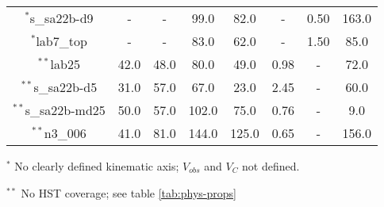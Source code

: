 \documentclass[fleqn,usenatbib]{mn2e}
\begin{document}
\begin{table*}
\begin{threeparttable}
\begin{tabular}{cccccccc}
$^{*}$s\_sa22b-d9   & -                    & -                      & 99.0                  & 82.0                   & -      & 0.50       & 163.0  \\
$^{*}$lab7\_top     & -                    & -                      & 83.0                  & 62.0                   & -      & 1.50       & 85.0  \\
$^{**}$lab25         & 42.0                    & 48.0                     & 80.0                  & 49.0                   & 0.98       & -       & 72.0 \\
$^{**}$s\_sa22b-d5   & 31.0                    & 57.0                     & 67.0                  & 23.0                   & 2.45      & -       & 60.0 \\
$^{**}$s\_sa22b-md25 & 50.0                    & 57.0                     & 102.0                 & 75.0                   & 0.76       & -       & 9.0  \\
$^{**}$n3\_006       & 41.0                    & 81.0                     & 144.0                 & 125.0                  & 0.65      & -       & 156.0 

\end{tabular}
\begin{tablenotes}
      \small
      \item $^{*}$ No clearly defined kinematic axis; $V_{obs}$ and $V_{C}$ not defined.
      \item $^{**}$ No HST coverage; see table \ref{tab:phys-props}
    \end{tablenotes}
  \end{threeparttable}
  \end{table*}
\end{document}
